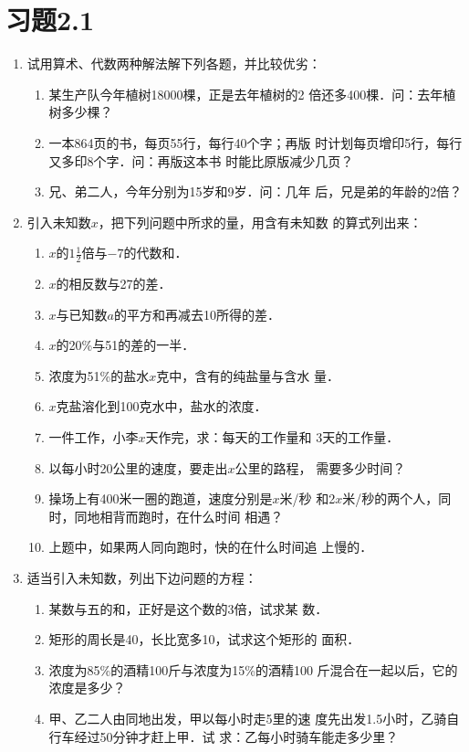 \section*{习题2.1}

\begin{enumerate}
    \item 试用算术、代数两种解法解下列各题，并比较优劣：
\begin{enumerate}
\item 某生产队今年植树18000棵，正是去年植树的2
倍还多400棵．问：去年植树多少棵？
\item 一本864页的书，每页55行，每行40个字；再版
时计划每页增印5行，每行又多印8个字．问：再版这本书
时能比原版减少几页？
\item 兄、弟二人，今年分别为15岁和9岁．问：几年
后，兄是弟的年龄的2倍？
\end{enumerate}

\item 引入未知数$x$，把下列问题中所求的量，用含有未知数
的算式列出来：
\begin{enumerate}
\item $x$的$1\frac{1}{2}$倍与$-7$的代数和．
\item $x$的相反数与27的差．
\item $x$与已知数$a$的平方和再减去10所得的差．
\item $x$的20\%与51的差的一半．
\item 浓度为51\%的盐水$x$克中，含有的纯盐量与含水
量．
\item $x$克盐溶化到100克水中，盐水的浓度．
\item 一件工作，小李$x$天作完，求：每天的工作量和
3天的工作量．
\item 以每小时20公里的速度，要走出$x$公里的路程，
需要多少时间？
\item 操场上有400米一圈的跑道，速度分别是$x$米/秒
和2$x$米/秒的两个人，同时，同地相背而跑时，在什么时间
相遇？
\item 上题中，如果两人同向跑时，快的在什么时间追
上慢的．
\end{enumerate}

\item  适当引入未知数，列出下边问题的方程：
\begin{enumerate}
\item 某数与五的和，正好是这个数的3倍，试求某
数．
\item 矩形的周长是40，长比宽多10，试求这个矩形的
面积．
\item 浓度为85\%的酒精100斤与浓度为15\%的酒精100
斤混合在一起以后，它的浓度是多少？
\item 甲、乙二人由同地出发，甲以每小时走5里的速
度先出发1.5小时，乙骑自行车经过50分钟才赶上甲．试
求：乙每小时骑车能走多少里？
\end{enumerate}


\end{enumerate}

